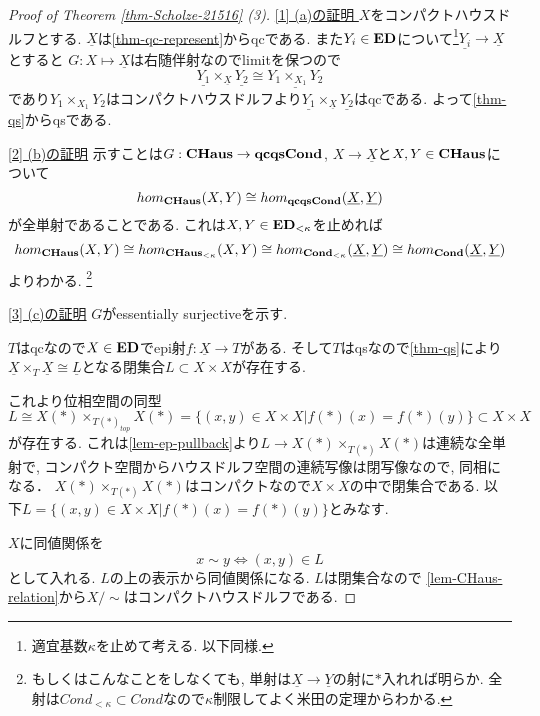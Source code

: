 \documentclass[dvipdfmx,a4paper,11pt]{article}
\theoremstyle{definition}
\begin{document}
\begin{proof}[Proof of Theorem \ref{thm-Scholze-21516} (3)]

\underline{[1] (a)の証明 }
$X$をコンパクトハウスドルフとする.
$\underline{X}$は\ref{thm-qc-represent}からqcである.
また$Y_i \in {\bf ED}$について\footnote{適宜基数$\kappa$を止めて考える. 以下同様.}$\underline{Y_i} \to \underline{X}$とすると
$G : X \mapsto \underline{X}$は右随伴射なのでlimitを保つので
$$
\underline{Y_1} \times_{\underline{X}}\underline{Y_2}
\cong  
\underline{Y_1 \times_{X_1}Y_2}
$$
であり$Y_1 \times_{X_1}Y_2$はコンパクトハウスドルフより$\underline{Y_1} \times_{\underline{X}}\underline{Y_2}$はqcである. よって\ref{thm-qs}からqsである.

\underline{[2] (b)の証明}
示すことは$G : {\bf CHaus} \to {\bf qcqsCond}$, $X \to \underline{X}$と$X,Y \in {\bf CHaus}$について
$$
hom_{\bf CHaus} (X,Y) \cong 
hom_{\bf qcqsCond}(\underline{X}, \underline{Y})
$$
が全単射であることである.
これは$X,Y \in {\bf ED}_{< \kappa}$を止めれば
$$
hom_{\bf CHaus} (X,Y) \cong 
hom_{\bf CHaus_{< \kappa}} (X,Y) \cong
hom_{\bf Cond_{< \kappa}}(\underline{X}, \underline{Y})
\cong hom_{\bf Cond}(\underline{X}, \underline{Y})
$$
よりわかる. \footnote{もしくはこんなことをしなくても, 単射は$\underline{X} \to \underline{Y}$の射に$\ast$入れれば明らか. 全射は$Cond_{< \kappa} \subset Cond$なので$\kappa$制限してよく米田の定理からわかる.}

\underline{[3] (c)の証明}
$G$がessentially surjectiveを示す. 

$T$はqcなので$X \in {\bf ED}$でepi射$f : \underline{X} \to T$がある. %
そして$T$はqsなので\ref{thm-qs}により
$\underline{X} \times_{T} \underline{X} \cong \underline{L}$となる閉集合$L \subset X \times X$が存在する. 

これより位相空間の同型
$$
L \cong  X(\ast) \times_{T(\ast)_{top}} X(\ast)=  \{ (x,y) \in X \times X | f(\ast)(x) = f(\ast)(y)\} \subset X \times X
$$ 
が存在する. 
これは\ref{lem-ep-pullback}より$L \to  X(\ast) \times_{T(\ast)} X(\ast)$は連続な全単射で, コンパクト空間からハウスドルフ空間の連続写像は閉写像なので, 同相になる．
$X(\ast) \times_{T(\ast)} X(\ast)$はコンパクトなので$X \times X$の中で閉集合である. 
以下$L=\{ (x,y) \in X \times X | f(\ast)(x) = f(\ast)(y)\}$とみなす. 

$X$に同値関係を
$$
x \sim y \Leftrightarrow (x,y) \in L
$$
として入れる. $L$の上の表示から同値関係になる. 
$L$は閉集合なので
\ref{lem-CHaus-relation}から$X / \sim $はコンパクトハウスドルフである.


\end{proof}
\end{document}
